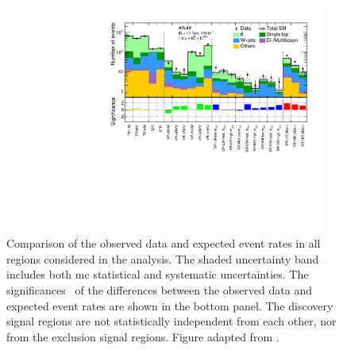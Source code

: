  \begin{figure}
	\centering\includegraphics[width=0.95\textwidth]{histpull_CRVRSR}
	\caption{Comparison of the observed data and expected event rates in all regions considered in the analysis. The shaded uncertainty band includes both \gls{mc} statistical and systematic uncertainties. The significances~\cite{Cousins:2007bmb} of the differences between the observed data and expected event rates are shown in the bottom panel. The discovery signal regions are not statistically independent from each other, nor from the exclusion signal regions. Figure adapted from \cite{SUSY-2019-08}.}
	\label{fig:result_histpull}
\end{figure}


\FloatBarrier

